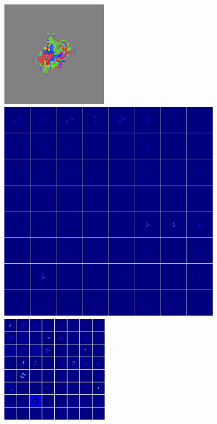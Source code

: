 \documentclass[11pt,a4paper]{article}
\begin{document}
\begin{figure}[!htb]
	\centering
	\includegraphics[scale=0.5]{fig/MAGBOX_oldPhys_600k_png0.png}\\
	\includegraphics[scale=0.3635]{fig/MAGBOX_oldPhys_600k_png0_conv1_output_8x8.png}
	\includegraphics[scale=1.0]{fig/MAGBOX_oldPhys_600k_png0_inception3b_output_8x8.png}

\end{figure}
\end{document}
